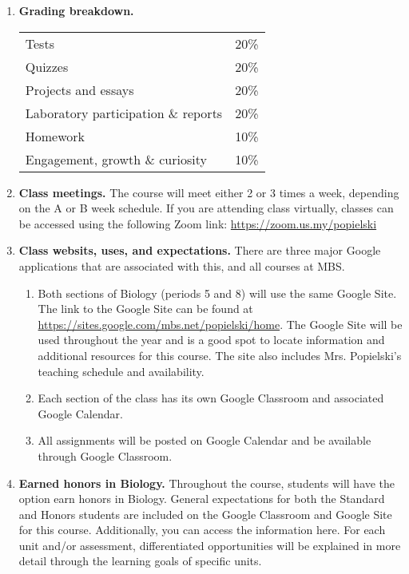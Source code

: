 \documentclass{article}
\begin{document}
\begin{enumerate}
\item \textbf{Grading breakdown.}
\begin{table}[h]
\begin{center}
\begin{tabular}{ll}
\toprule
Tests & 20\% \\
Quizzes & 20\% \\
Projects and essays & 20\% \\
Laboratory participation \& reports & 20\% \\
Homework & 10\% \\
Engagement, growth \& curiosity & 10\% \\
\bottomrule
\end{tabular}
\end{center}
\end{table}

\item \textbf{Class meetings.} The course will meet either 2 or 3 times a week, depending on the A or B week schedule. If you are attending class virtually, classes can be accessed using the following Zoom link: \url{https://zoom.us.my/popielski}

\item \textbf{Class websits, uses, and expectations.}
There are three major Google applications that are associated with this, and all courses at MBS.
\begin{enumerate}
\item Both sections of Biology (periods 5 and 8) will use the same Google Site. The link to the Google Site can be found at \url{https://sites.google.com/mbs.net/popielski/home}. The Google Site will be used throughout the year and is a good spot to locate information and additional resources for this course.  The site also includes Mrs. Popielski’s teaching schedule and availability.
\item Each section of the class has its own Google Classroom and associated Google Calendar.
\item All assignments will be posted on Google Calendar and be available through Google Classroom.
\end{enumerate}

\item \textbf{Earned honors in Biology.} Throughout the course, students will have the option earn honors in Biology. General expectations for both the Standard and Honors students are included on the Google Classroom and Google Site for this course. Additionally, you can access the information here. For each unit and/or assessment, differentiated opportunities will be explained in more detail through the learning goals of specific units.


\end{enumerate}
\end{document}
